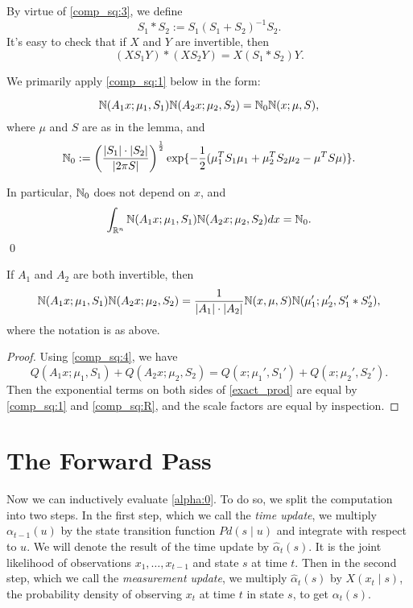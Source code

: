 \documentclass[12pt,leqno]{article}
\begin{document}
By virtue of \eqref{comp_sq:3}, we define
$$
S_1*S_2 := S_1(S_1+S_2)^{-1}S_2.
$$
It's easy to check that if $X$ and $Y$ are invertible, then
\begin{equation}\label{comp_sq:XY}
  (XS_1Y)*(XS_2Y) = X(S_1*S_2)Y. 
\end{equation}

We primarily apply \eqref{comp_sq:1} below in the form: 
\begin{Cor}\label{comp_sq:2}
$$
  {\mathbb N}(A_1x;\mu_1,S_1){\mathbb N}(A_2x;\mu_2,S_2) = {\mathbb N}_0{\mathbb N}(x;\mu,S),
  $$
where $\mu$ and $S$ are as in the lemma, and 
$$
{\mathbb N}_0 := \left(\frac{|S_1|\cdot|S_2|}{|2\pi{S}|}\right)^{\frac{1}{2}}\exp\{-\frac{1}{2}(\mu_1^TS_1\mu_1 + \mu_2^TS_2\mu_2-\mu^TS\mu)\}.
$$

In particular, ${\mathbb N}_0$ does not depend on $x$, and
\begin{equation}\label{comp_sq:int}
  \int_{{\mathbb R}^{n}}  {\mathbb N}(A_1x;\mu_1,S_1){\mathbb N}(A_2x;\mu_2,S_2)dx = {\mathbb N}_0.
\end{equation}
\qed
\end{Cor}

\begin{Cor}\label{exact_prod} 
 If $A_1$ and $A_2$ are both invertible, then 
$$
 {\mathbb N}(A_1x;\mu_1,S_1){\mathbb N}(A_2x;\mu_2,S_2)   = \frac{1}{|A_1|\cdot|A_2|}{\mathbb N}(x,\mu,S){\mathbb N}(\mu_1';\mu_2',S_1'*S_2'),
$$
 where the notation is as above.
\end{Cor}
\begin{proof}

  Using \eqref{comp_sq:4}, we have
$$
  Q(A_1x;\mu_1,S_1) + Q(A_2x;\mu_2,S_2)  = Q(x;\mu_1',S_1') + Q(x;\mu_2',S_2').
$$
  Then the exponential terms on both sides of \eqref{exact_prod} are equal by
  \eqref{comp_sq:1} and \eqref{comp_sq:R}, and the scale factors are equal by inspection.
\end{proof}


\section{The Forward Pass}
  Now we can inductively evaluate \eqref{alpha:0}. To do so, we split the computation
  into two steps.  In the first step, which we call the {\em time update}, we multiply
  $\alpha_{t-1}(u)$ by the state transition function $Pd(s\mid u)$ and integrate with respect
  to $u$. We will denote the result of the time update by $\hat{\alpha}_t(s)$.  It is the joint 
  likelihood of observations $x_1,\dots,x_{t-1}$ and state $s$ at time $t$.
  Then in the second step, which we call the {\em measurement update}, we multiply
  $\hat{\alpha}_t(s)$ by $X(x_t \mid s)$, the probability density of observing $x_t$ at time $t$
  in state $s$, to get $\alpha_t(s)$.  %
\end{document}
